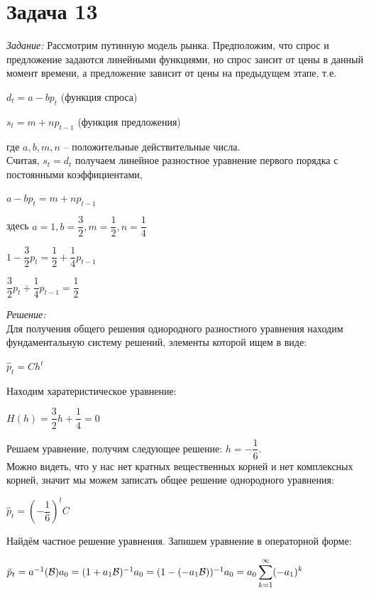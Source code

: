 \documentclass[14pt,fleqn]{extarticle}
\begin{document}
	\section*{Задача 13}
	\textit{Задание:} Рассмотрим путинную модель рынка. Предположим, что спрос и предложение задаются линейными функциями, но спрос заисит от цены в данный момент времени, а предложение зависит от цены на предыдущем этапе, т.е.
	\begin{center}
		$d_t = a - b p_t$ (функция спроса)
	\end{center}
	\begin{center}
		$s_t = m + n p_{t-1}$ (функция предложения)
	\end{center}
	где $a, b, m, n$ -- положительные действительные числа.\\
	Считая, $s_t = d_t$ получаем линейное разностное уравнение первого порядка с постоянными коэффициентами,\\
	\begin{center}
		$a - b p_t = m + n p_{t-1}$
	\end{center}
	здесь $a = 1, b = \dfrac{3}{2}, m = \dfrac{1}{2}, n = \dfrac{1}{4}$
	\begin{center}
		$1 - \dfrac{3}{2} p_t = \dfrac{1}{2} + \dfrac{1}{4} p_{t-1}$
	\end{center}
	\begin{center}
		$\dfrac{3}{2} p_t + \dfrac{1}{4} p_{t-1} = \dfrac{1}{2}$
	\end{center}
	\textit{Решение:}\\
	Для получения общего решения однородного разностного уравнения находим фундаментальную систему решений, элементы которой ищем в виде:
	\begin{center}
		$\hat{p}_t = Ch^t$
	\end{center}
	Находим харатеристическое уравнение:
	\begin{center}
		$H(h) = \dfrac{3}{2}h + \dfrac{1}{4} = 0$
	\end{center}
	Решаем уравнение, получим следующее решение: $h = -\dfrac{1}{6}$.\\
	Можно видеть, что у нас нет кратных вещественных корней и нет комплексных корней, значит мы можем записать общее решение однородного уравнения:
	\begin{center}
		$\hat{p}_t = \left(-\dfrac{1}{6}\right)^tC$
	\end{center}
	Найдём частное решение уравнения. Запишем уравнение в операторной форме:
	\begin{center}
	$\breve{p}_t = a^{-1}(\mathcal{B}) a_0 = (1 + a_1\mathcal{B})^{-1}a_0 = (1 - (-a_1\mathcal{B}))^{-1}a_0 = a_0 \smashoperator[r]{\sum_{k=1}^{\infty}}(-a_1)^k$
	\end{center}
\end{document}
